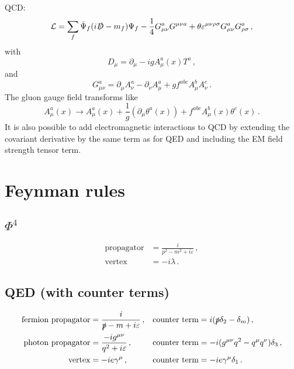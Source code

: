 \documentclass[12pt]{memoir}
\begin{document}
\begin{appendices}
  QCD:
  \begin{equation}
    \mathcal{L} = \sum_f \bar{\Psi}_f (i\slashed{D} - m_f) \Psi_f - \frac{1}{4} G_{\mu\nu}^a G^{\mu\nu a}
    + \theta \varepsilon^{\mu\nu\rho\sigma} G_{\mu\nu}^a G_{\rho\sigma}^a \,,
  \end{equation}
  with
  \begin{equation}
    D_{\mu} = \partial_{\mu} - i g A_{\mu}^a (x) T^a\,,
  \end{equation}
  and
  \begin{equation}
    G_{\mu\nu}^a = \partial_{\mu} A_{\nu}^a - \partial_{\nu} A_{\mu}^a  + g f^{abc} A_{\mu}^b A_{\nu}^c \,.
  \end{equation}
  The gluon gauge field transforms like
  \begin{equation}
    A_{\mu}^a(x) \rightarrow A_{\mu}^a(x) + \frac{1}{g} (\partial_{\mu} \theta^a(x)) + f^{abc} A^b_{\mu}(x) \theta^c(x)\,.
  \end{equation}
  It is also possible to add electromagnetic interactions to QCD by extending the covariant derivative
  by the same term as for QED and including the EM field strength tensor term.

  \section{Feynman rules}

  \subsection{$\Phi^4$}

  \begin{align}
    \text{propagator} &= \frac{i}{p^2 - m^2 + i \varepsilon}\,, \\
    \text{vertex} &= -i \lambda\,.
  \end{align}

  \subsection{QED (with counter terms)}
  \begin{align}
    \text{fermion propagator} &= \frac{i}{\slashed{p} - m + i \varepsilon}\,,
                              & \text{counter term} &= i (\slashed{p}\delta_2 - \delta_m)\,, \\
    \text{photon propagator} &= \frac{-i g^{\mu\nu}}{q^2 + i \varepsilon}\,,
                              & \text{counter term} &= - i (g^{\mu\nu}q^2 - q^{\mu}q^{\nu}) \delta_3\,, \\
    \text{vertex} &= -i e \gamma^{\mu}\,, & \text{counter term} &=-i e \gamma^{\mu} \delta_1\,.
  \end{align}


\end{appendices}
\end{document}
